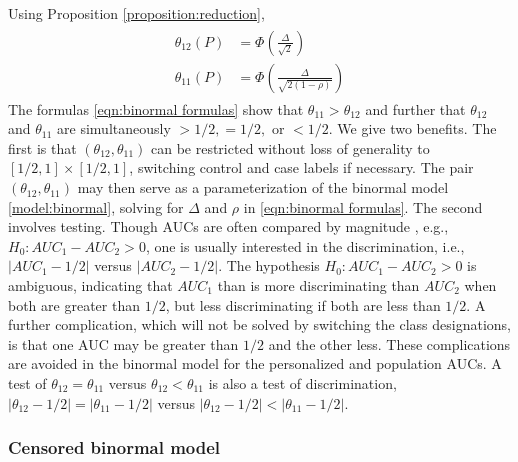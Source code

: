 \documentclass[12pt]{article}
\DeclareMathOperator{\AUC}{AUC}
\newcommand{\cind}{\perp \!\!\! \perp}
\newcommand{\aucindiv}{\theta_{11}}%
\newcommand{\aucpop}{\theta_{12}}%
\newcommand{\comment}[1]{
  \iftoggle{commenttoggle}{
    {\normalsize{\color{red}{ #1}}\normalsize}
  }
  {}
}
\begin{document}
Using Proposition \ref{proposition:reduction},
\begin{gather}
  \begin{aligned}
  \aucpop(P) &= \Phi\left(\frac{\Delta}{\sqrt{2}}\right)\\
  \aucindiv(P) &=  \Phi\left(\frac{\Delta}{\sqrt{2(1-\rho)}}\right)\label{eqn:binormal formulas}
\end{aligned}
\end{gather}
The formulas \eqref{eqn:binormal formulas} show that $\aucindiv>\aucpop$ and further that $\aucpop$ and
$\aucindiv$ are simultaneously $>1/2,=1/2,$ or $<1/2$. We give two benefits. The
first is that $(\aucpop,\aucindiv)$ can be restricted without loss of
generality to $[1/2,1]\times[1/2,1]$, switching control and case labels if necessary. The pair $(\aucpop,\aucindiv)$  may then serve as a
parameterization of the binormal model \eqref{model:binormal}, solving for $\Delta$ and $\rho$ in \eqref{eqn:binormal formulas}.  The
second involves testing. Though AUCs are often compared by magnitude%
, e.g., $H_0:AUC_1-AUC_2>0$, one is
usually interested in the discrimination, i.e., $|AUC_1-1/2|$ versus
$|AUC_2-1/2|$. The hypothesis $H_0:AUC_1-AUC_2>0$ is ambiguous, indicating that
$AUC_1$ than is more discriminating than $AUC_2$ when both are greater than $1/2$, but less
discriminating if both are less than $1/2$.  A further complication, which will not
be solved by switching the class designations, is
that one AUC may be greater than $1/2$ and the other less. These complications are
avoided in the binormal model for the personalized and population
AUCs. A test of $\aucpop=\aucindiv$ versus $\aucpop<\aucindiv$ is also a test of
discrimination, $|\aucpop-1/2|=|\aucindiv-1/2|$ versus $|\aucpop-1/2|<|\aucindiv-1/2|$.

\subsubsection{Censored binormal model}
\end{document}
